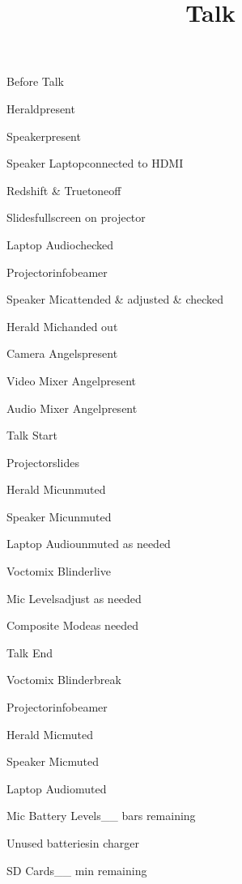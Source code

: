 \def\papersize{5}




\title{Talk}

\begin{checklist}{Before Talk}
  \item{Herald}{present}
  \item{Speaker}{present}
  \item{Speaker Laptop}{connected to HDMI}
  \item{Redshift \& Truetone}{off}
  \item{Slides}{fullscreen on projector}
  \item{Laptop Audio}{checked}
  \item{Projector}{infobeamer}
  \item{Speaker Mic}{attended \& adjusted \& checked}
  \item{Herald Mic}{handed out}
  \item{Camera Angels}{present}
  \item{Video Mixer Angel}{present}
  \item{Audio Mixer Angel}{present}
\end{checklist}

\begin{checklist}{Talk Start}
  \item{Projector}{slides}
  \item{Herald Mic}{unmuted}
  \item{Speaker Mic}{unmuted}
  \item{Laptop Audio}{unmuted as needed}
  \item{Voctomix Blinder}{live}
  \item{Mic Levels}{adjust as needed}

  \item{Composite Mode}{as needed}
\end{checklist}

\begin{checklist}{Talk End}
  \item{Voctomix Blinder}{break}
  \item{Projector}{infobeamer}
  \item{Herald Mic}{muted}
  \item{Speaker Mic}{muted}
  \item{Laptop Audio}{muted}
  \item{Mic Battery Levels}{\_\_ bars remaining}
  \item{Unused batteries}{in charger}

  \item{SD Cards}{\_\_ min remaining}
\end{checklist}


